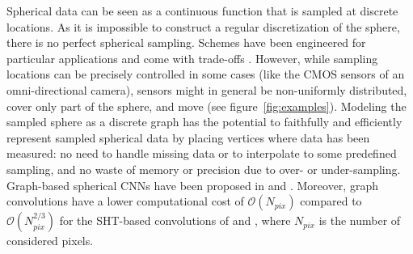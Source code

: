 \documentclass{article} %
\newcommand{\figref}[1]{figure~\ref{fig:#1}}
\newcommand{\1}{\b{1}}              %
\newcommand{\0}{\b{0}}              %
\newcommand{\R}{\mathbb{R}}
\newcommand{\bO}{\mathcal{O}}
\newcommand{\todo}[1]{{\color[rgb]{.6,.1,.6}{#1}}}
\begin{document}
Spherical data can be seen as a continuous function
that is sampled at discrete locations.
As it is impossible to construct a regular discretization of the sphere, there is no perfect spherical sampling.
Schemes have been engineered for particular applications and come with trade-offs \citep{gorski2005healpix,glesp}.
However, while sampling locations can be precisely controlled in some cases (like the CMOS sensors of an omni-directional camera), sensors might in general be non-uniformly distributed, cover only part of the sphere, and move (see \figref{examples}).
Modeling the sampled sphere as a discrete graph has the potential to faithfully and efficiently represent sampled spherical data by placing vertices where data has been measured: no need to handle missing data or to interpolate to some predefined sampling, and no waste of memory or precision due to over- or under-sampling.
Graph-based spherical CNNs have been proposed in \citet{khasanova2017graphomni} and \citet{perraudin2018deepsphere}.
Moreover, graph convolutions have a lower computational cost of $\bO(N_{pix})$ compared to $\bO(N_{pix}^{2/3})$ for the SHT-based convolutions of \citet{cohen2018sphericalcnn} and \citet{esteves2017sphericalcnn}, where $N_{pix}$ is the number of considered pixels.



\end{document}

